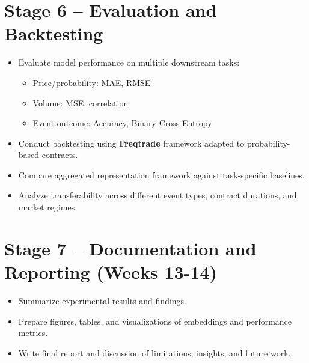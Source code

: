 \section{Stage 6 – Evaluation and Backtesting}

\begin{itemize}
    \item Evaluate model performance on multiple downstream tasks:
        \begin{itemize}
            \item Price/probability: MAE, RMSE
            \item Volume: MSE, correlation
            \item Event outcome: Accuracy, Binary Cross-Entropy
        \end{itemize}
    \item Conduct backtesting using \textbf{Freqtrade} framework adapted to probability-based contracts.
    \item Compare aggregated representation framework against task-specific baselines.
    \item Analyze transferability across different event types, contract durations, and market regimes.
\end{itemize}

\section{Stage 7 – Documentation and Reporting (Weeks 13-14)}

\begin{itemize}
    \item Summarize experimental results and findings.
    \item Prepare figures, tables, and visualizations of embeddings and performance metrics.
    \item Write final report and discussion of limitations, insights, and future work.
\end{itemize}